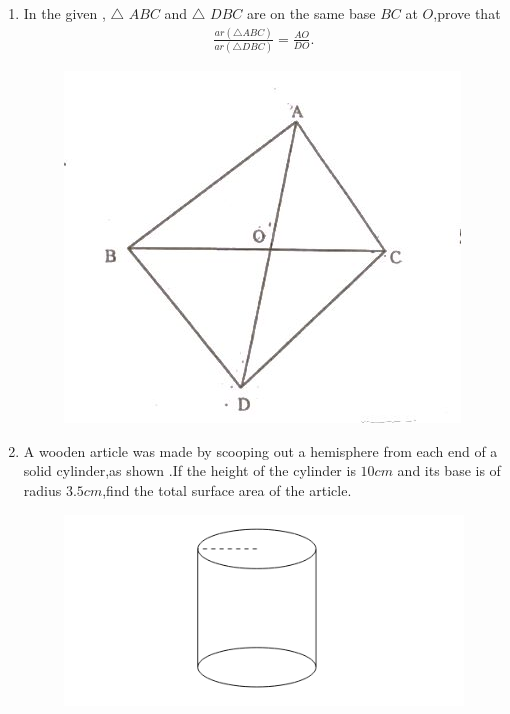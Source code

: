 \begin{enumerate}
    \item   In the given , $\triangle$ $ABC$ and  $\triangle$ $DBC$ are on the same base $BC$ at $O$,prove that
    \begin{align}
         \frac{ar (\triangle  ABC)}{ar (\triangle DBC)} = \frac{AO}{DO}.
    \end{align}
     \begin{figure}[H]
  \centering
  \includegraphics[width=\columnwidth]{figs/square.jpeg}
  \caption{}
  \label{fig:figure3}
\end{figure}
\pagebreak
     \item  A wooden article was made by scooping out a hemisphere from each end of a solid cylinder,as shown .If the height of the cylinder is $10 cm$ and its base is of radius $3.5 cm$,find the total surface area of the article.
      \begin{figure}[H]
  \centering
  \includegraphics[width=\columnwidth]{figs/cylinder.png}
  \caption{}
  \label{fig:figure4}
\end{figure}


\end{enumerate}
%











